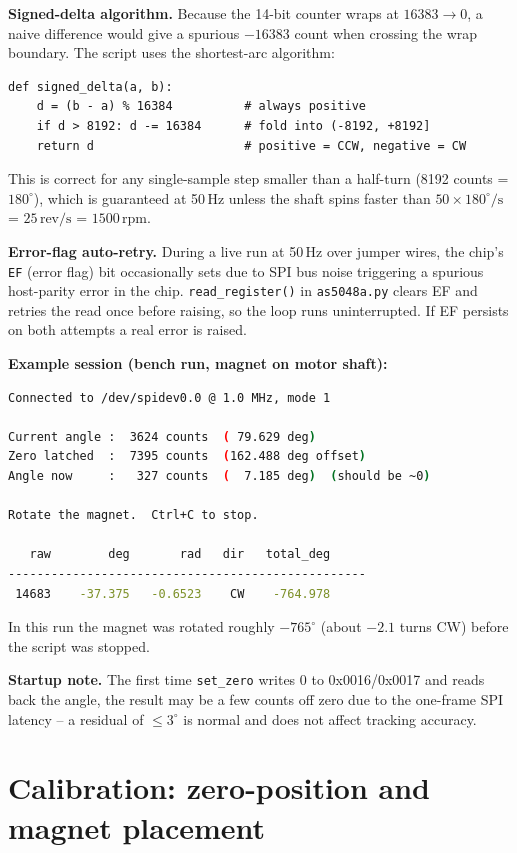 \documentclass[11pt,a4paper]{article}
\begin{document}
\textbf{Signed-delta algorithm.}  Because the 14-bit counter wraps at
$16383 \to 0$, a naive difference would give a spurious $-16383$ count
when crossing the wrap boundary.  The script uses the shortest-arc
algorithm:
\begin{lstlisting}
def signed_delta(a, b):
    d = (b - a) % 16384          # always positive
    if d > 8192: d -= 16384      # fold into (-8192, +8192]
    return d                     # positive = CCW, negative = CW
\end{lstlisting}
This is correct for any single-sample step smaller than a half-turn
(8192 counts = $180^{\circ}$), which is guaranteed at 50\,Hz unless
the shaft spins faster than $50 \times 180^{\circ}/\text{s}$ =
$25\,\text{rev/s}$ = $1500\,\text{rpm}$.

\textbf{Error-flag auto-retry.}  During a live run at 50\,Hz over
jumper wires, the chip's \texttt{EF} (error flag) bit occasionally
sets due to SPI bus noise triggering a spurious host-parity error in
the chip.  \texttt{read\_register()} in \texttt{as5048a.py} clears EF
and retries the read once before raising, so the loop runs
uninterrupted.  If EF persists on both attempts a real error is raised.

\textbf{Example session (bench run, magnet on motor shaft):}
\begin{lstlisting}[language=bash]
Connected to /dev/spidev0.0 @ 1.0 MHz, mode 1

Current angle :  3624 counts  ( 79.629 deg)
Zero latched  :  7395 counts  (162.488 deg offset)
Angle now     :   327 counts  (  7.185 deg)  (should be ~0)

Rotate the magnet.  Ctrl+C to stop.

   raw        deg       rad   dir   total_deg
--------------------------------------------------
 14683    -37.375   -0.6523    CW    -764.978
\end{lstlisting}
In this run the magnet was rotated roughly $-765^{\circ}$ (about
$-2.1$ turns CW) before the script was stopped.

\textbf{Startup note.}  The first time \texttt{set\_zero} writes 0 to
0x0016/0x0017 and reads back the angle, the result may be a few counts
off zero due to the one-frame SPI latency -- a residual of
$\leq 3^{\circ}$ is normal and does not affect tracking accuracy.

\section{Calibration: zero-position and magnet placement}
\end{document}
